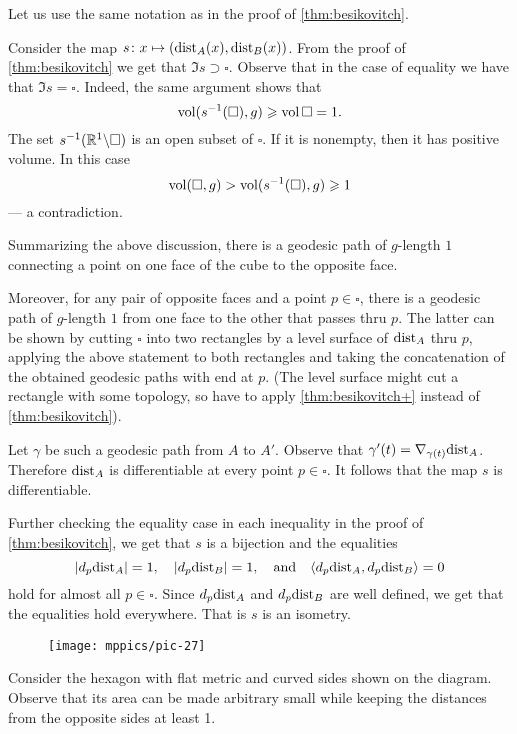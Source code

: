 Let us use the same notation as in the proof of \ref{thm:besikovitch}.

Consider the map $s\colon x\mapsto(\mathrm{dist}_A(x),\mathrm{dist}_B(x))$.
From the proof of \ref{thm:besikovitch} we get that $\Im s\supset \square$.
Observe that in the case of equality we have that $\Im s= \square$.
Indeed,
the same argument shows that 
\[\operatorname{\rm vol}\nolimits(s^{-1}(\square),g)\geqslant \operatorname{\rm vol}\nolimits\square=1.\]
The set $s^{-1}(\mathbb{R}^1\backslash \square)$ is an open subset of $\square$.
If it is nonempty, then it has positive volume.
In this case
\[\operatorname{\rm vol}\nolimits(\square,g)>\operatorname{\rm vol}\nolimits(s^{-1}(\square),g)\geqslant 1\]
--- a contradiction.

Summarizing the above discussion, there is a geodesic path of $g$-length $1$ connecting a point on one face of the cube to the opposite face.

Moreover, for any pair of opposite faces and a point $p\in\square$, there is a geodesic path of $g$-length $1$ from one face to the other that passes thru $p$.
The latter can be shown by cutting $\square$ into two rectangles by a level surface of $\mathrm{dist}_A$ thru $p$,
applying the above statement to both rectangles and taking the concatenation of the obtained geodesic paths with end at $p$.
(The level surface might cut a rectangle with some topology, so have to apply \ref{thm:besikovitch+} instead of \ref{thm:besikovitch}).

Let $\gamma$ be such a geodesic path from $A$ to $A'$.
Observe that $\gamma'(t)\z=\nabla_{\gamma(t)}\distfun_A$.
Therefore $\mathrm{dist}_A$ is differentiable at every point $p\in \square$.
It follows that the map $s$ is differentiable.

Further checking the equality case in each inequality in the proof of \ref{thm:besikovitch}, we get that $s$ is a bijection and the equalities
\[|d_{p}\mathrm{dist}_A|= 1,\quad|d_{p}\mathrm{dist}_B|=1,\quad \text{and}\quad \langle d_{p}\mathrm{dist}_A,d_{p}\mathrm{dist}_B\rangle= 0\]
hold for almost all $p\in\square$.
Since $d_{p}\mathrm{dist}_A$ and $d_{p}\mathrm{dist}_B$ are well defined, we get that the equalities hold everywhere.
That is $s$ is an isometry.

\begin{wrapfigure}{r}{45 mm}
\vskip-4mm
\centering
\texttt{[image: mppics/pic-27]}
\end{wrapfigure}

Consider the hexagon with flat metric and curved sides shown on the diagram.
Observe that its area can be made arbitrary small while keeping the distances from the opposite sides at least 1.

